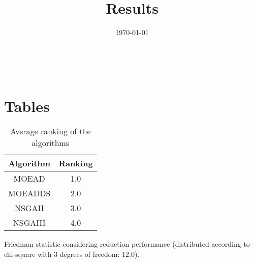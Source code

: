 \documentclass{article}
\title{Results}
\author{}
\date{\today}
\begin{document}
\oddsidemargin 0in \topmargin 0in\maketitle
\
\section{Tables}
\begin{table}[!htp]
\centering
\caption{Average ranking of the algorithms}
\begin{tabular}{c|c}
Algorithm&Ranking\\
\hline
MOEAD&1.0\\
MOEADDS&2.0\\
NSGAII&3.0\\
NSGAIII&4.0\\
\end{tabular}
\end{table}


Friedman statistic considering reduction performance (distributed according to chi-square with 3 degrees of freedom: 12.0).
\end{document}
